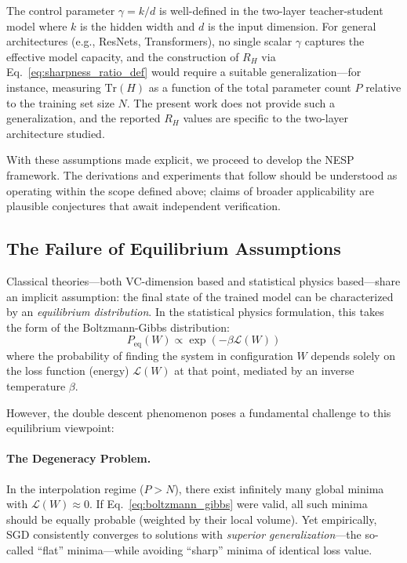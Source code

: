 \documentclass[
  journal=largetwo,
  simfonts=false,
  year=2025,
  volume=37,
]{cup-journal}
\begin{document}
\begin{assumption}\label{assump:gamma}
The control parameter $\gamma = k/d$ is well-defined in the two-layer teacher-student model where $k$ is the hidden width and $d$ is the input dimension. For general architectures (e.g., ResNets, Transformers), no single scalar $\gamma$ captures the effective model capacity, and the construction of $R_H$ via Eq.~\ref{eq:sharpness_ratio_def} would require a suitable generalization---for instance, measuring $\mathrm{Tr}(H)$ as a function of the total parameter count $P$ relative to the training set size $N$. The present work does not provide such a generalization, and the reported $R_H$ values are specific to the two-layer architecture studied.
\end{assumption}

With these assumptions made explicit, we proceed to develop the NESP framework. The derivations and experiments that follow should be understood as operating within the scope defined above; claims of broader applicability are plausible conjectures that await independent verification.

\subsection{The Failure of Equilibrium Assumptions}

Classical theories---both VC-dimension based and statistical physics based---share an implicit assumption: the final state of the trained model can be characterized by an \textit{equilibrium distribution}. In the statistical physics formulation, this takes the form of the Boltzmann-Gibbs distribution:
\begin{equation}\label{eq:boltzmann_gibbs}
    P_{\text{eq}}(W) \propto \exp\left(-\beta \mathcal{L}(W)\right)
\end{equation}
where the probability of finding the system in configuration $W$ depends solely on the loss function (energy) $\mathcal{L}(W)$ at that point, mediated by an inverse temperature $\beta$.

However, the double descent phenomenon poses a fundamental challenge to this equilibrium viewpoint:

\paragraph{The Degeneracy Problem.} In the interpolation regime ($P > N$), there exist infinitely many global minima with $\mathcal{L}(W) \approx 0$. If Eq.~\eqref{eq:boltzmann_gibbs} were valid, all such minima should be equally probable (weighted by their local volume). Yet empirically, SGD consistently converges to solutions with \textit{superior generalization}---the so-called ``flat'' minima---while avoiding ``sharp'' minima of identical loss value.
\end{document}
